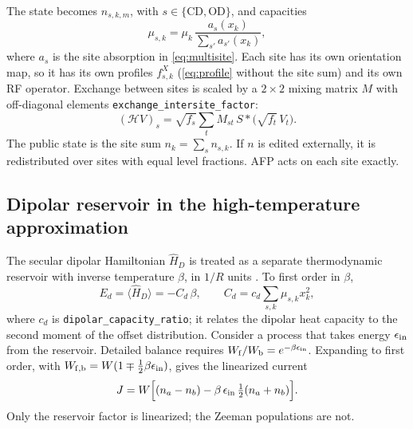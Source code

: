 \documentclass[11pt]{article}
\newcommand{\code}[1]{\texttt{#1}}
\begin{document}
The state becomes \(n_{s,k,m}\), with \(s\in\{\mathrm{CD},\mathrm{OD}\}\), and capacities
\begin{equation}
\mu_{s,k}=\mu_k\,\frac{a_s(x_k)}{\sum_{s'}a_{s'}(x_k)},
\end{equation}
where \(a_s\) is the site absorption in \cref{eq:multisite}. Each site has its own orientation
map, so it has its own profiles \(f^X_{s,k}\) (\cref{eq:profile} without the site sum) and its
own RF operator. Exchange between sites is scaled by a \(2\times2\) mixing matrix \(M\) with
off-diagonal elements \code{exchange\_intersite\_factor}:
\begin{equation}
(\mathcal{H}V)_{s} = \sqrt{f_s}\sum_t M_{st}\,S*\bigl(\sqrt{f_t}\,V_t\bigr).
\end{equation}
The public state is the site sum \(n_k=\sum_sn_{s,k}\). If \(n\) is edited externally, it is
redistributed over sites with equal level fractions. AFP acts on each site exactly.

\subsection{Dipolar reservoir in the high-temperature approximation}

The secular dipolar Hamiltonian \(\hat H_D\) is treated as a separate thermodynamic reservoir with
inverse temperature \(\beta\), in \(1/R\) units \cite{Provotorov1962,Goldman1970,AbragamGoldman1982}.
To first order in \(\beta\),
\begin{equation}
E_d=\langle\hat H_D\rangle=-C_d\,\beta,\qquad C_d = c_d\sum_{s,k}\mu_{s,k}x_k^2,
\end{equation}
where \(c_d\) is \code{dipolar\_capacity\_ratio}; it relates the dipolar heat capacity to the
second moment of the offset distribution. Consider a process that takes energy
\(\epsilon_{\rm in}\) from the reservoir. Detailed balance requires
\(W_{\rm f}/W_{\rm b}=e^{-\beta\epsilon_{\rm in}}\). Expanding to first order, with
\(W_{\rm f,b}=W(1\mp\tfrac12\beta\epsilon_{\rm in})\), gives the linearized current
\begin{equation}
J = W\Bigl[(n_a-n_b)-\beta\,\epsilon_{\rm in}\,\tfrac12(n_a+n_b)\Bigr].
\label{eq:dbalance}
\end{equation}
Only the reservoir factor is linearized; the Zeeman populations are not.
\end{document}

